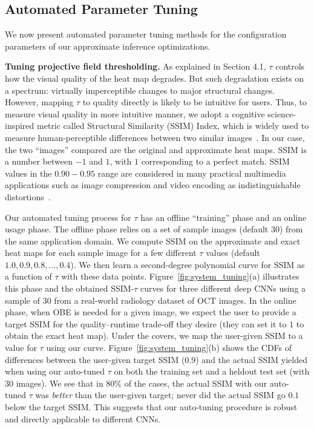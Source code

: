 \subsection{Automated Parameter Tuning}
We now present automated parameter tuning methods for the configuration parameters of our approximate inference optimizations.

\vspace{2mm}
\noindent \textbf{Tuning projective field thresholding.}
As explained in Section 4.1, $\tau$ controls how the visual quality of the heat map degrades. But such degradation exists on a spectrum: virtually imperceptible changes to major structural changes. However, mapping $\tau$ to quality directly is likely to be intuitive for users. Thus, to measure visual quality in more intuitive manner, we adopt a cognitive science-inspired metric called Structural Similarity (SSIM) Index, which is widely used to measure human-perceptible differences between two similar images~\cite{wang2004image}. In our case, the two ``images'' compared are the original and approximate heat maps. SSIM is a number between $-1$ and $1$, with $1$ corresponding to a perfect match. SSIM values in the $0.90-0.95$ range are considered in many practical multimedia applications such as image compression and video encoding as indistinguishable distortions~\cite{wang2004image}.

Our automated tuning process for $\tau$ has an offline ``training'' phase and an online usage phase. The offline phase relies on a set of sample images (default $30$) from the same application domain. We compute SSIM on the approximate and exact heat maps for each sample image for a few different $\tau$ values (default $1.0, 0.9, 0.8, \dots, 0.4$). We then learn a second-degree polynomial curve for SSIM as a function of $\tau$ with these data points. Figure~\ref{fig:system_tuning}(a) illustrates this phase and the obtained SSIM-$\tau$ curves for three different deep CNNs using a sample of $30$ from a real-world radiology dataset of OCT images.
In the online phase, when OBE is needed for a given image, we expect the user to provide a target SSIM for the quality--runtime trade-off they desire (they can set it to $1$ to obtain the exact heat map). Under the covers, we map the user-given SSIM to a value for $\tau$ using our curve. 
Figure~\ref{fig:system_tuning}(b) shows the CDFs of differences between the user-given target SSIM ($0.9$) and the actual SSIM yielded when using our auto-tuned $\tau$ on both the training set and a heldout test set (with $30$ images). We see that in $80\%$ of the cases, the actual SSIM with our auto-tuned $\tau$ was \textit{better} than the user-given target; never did the actual SSIM go $0.1$ below the target SSIM. This suggests that our auto-tuning procedure is robust and directly applicable to different CNNs.

